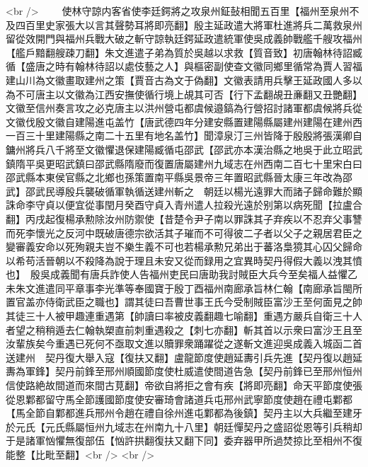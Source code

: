 <br />
　　使林守諒内客省使李廷鍔將之攻泉州鉦鼔相聞五百里【福州至泉州不及四百里史家張大以言其聲勢耳將即亮翻】殷主延政遣大將軍杜進將兵二萬救泉州留從效開門與福州兵戰大破之斬守諒執廷鍔延政遣統軍使吳成義帥戰艦千艘攻福州【艦戶黯翻艘疎刀翻】朱文進遣子弟為質於吳越以求救【質音致】初唐翰林待詔臧循【盛唐之時有翰林待詔以處伎藝之人】與樞密副使查文徽同鄉里循常為賈人習福建山川為文徽畫取建州之策【賈音古為文于偽翻】文徽表請用兵擊王延政國人多以為不可唐主以文徽為江西安撫使循行境上覘其可否【行下孟翻覘丑亷翻又丑艷翻】文徽至信州奏言攻之必克唐主以洪州營屯都虞候邉鎬為行營招討諸軍都虞候將兵從文徽伐殷文徽自建陽進屯盖竹【唐武德四年分建安縣置建陽縣屬建州建陽在建州西一百三十里建陽縣之南二十五里有地名盖竹】聞漳泉汀三州皆降于殷殷將張漢卿自鏞州將兵八千將至文徽懼退保建陽臧循屯邵武【邵武亦本漢治縣之地吳于此立昭武鎮隋平吳更昭武鎮曰邵武縣隋廢而復置唐屬建州九域志在州西南二百七十里宋白曰邵武縣本東侯官縣之北鄉也孫策置南平縣吳景帝三年置昭武縣晉太康三年改為邵武】邵武民導殷兵襲破循軍執循送建州斬之　朝廷以楊光遠罪大而諸子歸命難於顯誅命李守貞以便宜從事閏月癸酉守貞入青州遣人拉殺光遠於别第以病死聞【拉盧合翻】丙戌起復楊承勲除汝州防禦使【昔楚令尹子南以罪誅其子弃疾以不忍弃父事讐而死李懷光之反河中既破唐德宗欲活其子璀而不可得彼二子者以父子之親居君臣之變審義安命以死殉親夫豈不樂生義不可也若楊承勲兄弟出于蕃洛梟獍其心囚父歸命以希苟活晉朝以不殺降為說于理且未安又從而録用之宜異時契丹得假大義以洩其憤也】　殷吳成義聞有唐兵詐使人告福州吏民曰唐助我討賊臣大兵今至矣福人益懼乙未朱文進遣同平章事李光準等奉國寶于殷丁酉福州南廊承旨林仁翰【南廊承旨閩所置官盖亦侍衛武臣之職也】謂其徒曰吾曹世事王氏今受制賊臣富沙王至何面見之帥其徒三十人被甲趣連重遇第【帥讀曰率被皮義翻趣七喻翻】重遇方嚴兵自衛三十人者望之稍稍遁去仁翰執槊直前刺重遇殺之【刺七亦翻】斬其首以示衆曰富沙王且至汝輩族矣今重遇已死何不亟取文進以贖罪衆踊躍從之遂斬文進迎吳成義入城函二首送建州　契丹復大舉入寇【復扶又翻】盧龍節度使趙延夀引兵先進【契丹復以趙延夀為軍鋒】契丹前鋒至邢州順國節度使杜威遣使間道告急【契丹前鋒已至邢州恒州信使路絶故間道而來間古莧翻】帝欲自將拒之會有疾【將即亮翻】命天平節度使張從恩鄴都留守馬全節護國節度使安審琦會諸道兵屯邢州武寧節度使趙在禮屯鄴都【馬全節自鄴都進兵邢州令趙在禮自徐州進屯鄴都為後鎮】契丹主以大兵繼至建牙於元氏【元氏縣屬恒州九域志在州南九十八里】朝廷憚契丹之盛詔從恩等引兵稍却于是諸軍忷懼無復部伍【忷許拱翻復扶又翻下同】委弃器甲所過焚掠比至相州不復能整【比毗至翻】<br />
<br />
